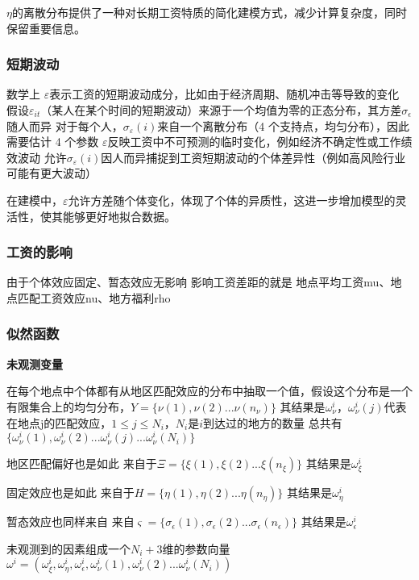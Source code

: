 \documentclass[10pt,a4paper]{article}
\begin{document}
$\eta$的离散分布提供了一种对长期工资特质的简化建模方式，减少计算复杂度，同时保留重要信息。

\subsubsection{短期波动}

数学上
$\varepsilon$表示工资的短期波动成分，比如由于经济周期、随机冲击等导致的变化
假设$\varepsilon_{it}$（某人在某个时间的短期波动）来源于一个均值为零的正态分布，其方差$\sigma_{\epsilon}$随人而异
对于每个人，$\sigma_\varepsilon(i)$来自一个离散分布（4 个支持点，均匀分布），因此需要估计 4 个参数
$\varepsilon$反映工资中不可预测的临时变化，例如经济不确定性或工作绩效波动
允许$\sigma_\varepsilon(i)$因人而异捕捉到工资短期波动的个体差异性（例如高风险行业可能有更大波动）


在建模中，$\varepsilon$允许方差随个体变化，体现了个体的异质性，这进一步增加模型的灵活性，使其能够更好地拟合数据。

\subsubsection{工资的影响}

由于个体效应固定、暂态效应无影响
影响工资差距的就是
地点平均工资mu、地点匹配工资效应nu、地方福利rho

\subsubsection{似然函数}

\textbf{未观测变量}

在每个地点中个体都有从地区匹配效应的分布中抽取一个值，假设这个分布是一个有限集合上的均匀分布，$Y=\{\nu(1),\nu(2)...\nu(n_{\nu})\}$
其结果是$\omega^{i}_{\nu}$，$\omega^{i}_{\nu}(j)$代表在地点j的匹配效应，$1\leqslant j\leqslant N_i$，$N_i$是$i$到达过的地方的数量
总共有$\{\omega^{i}_{\nu}(1),\omega^{i}_{\nu}(2)...\omega^{i}_{\nu}(j)...\omega^{i}_{\nu}(N_i)\}$

地区匹配偏好也是如此
来自于$\Xi=\{\xi(1),\xi(2)...\xi(n_{\xi})\}$
其结果是$\omega^{i}_{\xi}$

固定效应也是如此
来自于$H=\{\eta(1),\eta(2)...\eta(n_\eta)\}$
其结果是$\omega^{i}_{\eta}$

暂态效应也同样来自
来自$\varsigma=\{\sigma_{\epsilon}(1),\sigma_{\epsilon}(2)...\sigma_{\epsilon}(n_{\epsilon})\}$
其结果是$\omega^{i}_{\epsilon}$

未观测到的因素组成一个$N_{i}+3$维的参数向量$\omega^{i}=(\omega^{i}_{\xi},\omega^{i}_{\eta},\omega^{i}_{\epsilon},\omega^{i}_{\nu}(1),\omega^{i}_{\nu}(2)...\omega^{i}_{\nu}(N_{i}))$
\end{document}
